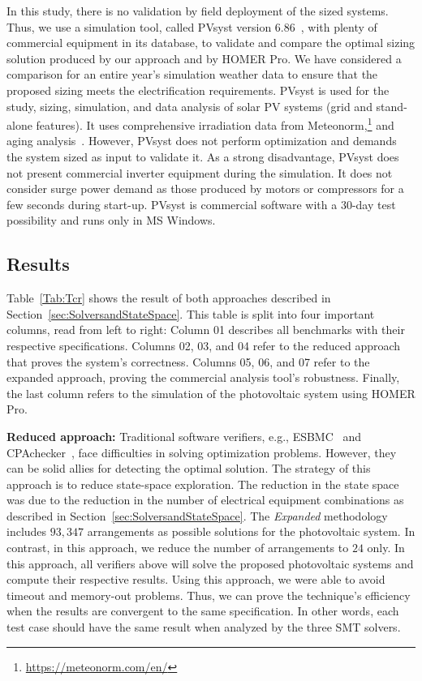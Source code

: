 \documentclass[a4paper,donotrepeattitle,fleqn]{cas-dc}
\begin{document}
In this study, there is no validation by field deployment of the sized systems. Thus, we use a simulation tool, called PVsyst version $6.86$~\cite{PVsyst}, with plenty of commercial equipment in its database, to validate and compare the optimal sizing solution produced by our approach and by HOMER Pro. We have considered a comparison for an entire year's simulation weather data to ensure that the proposed sizing meets the electrification requirements. PVsyst is used for the study, sizing, simulation, and data analysis of solar PV systems (grid and stand-alone features). It uses comprehensive irradiation data from Meteonorm,\footnote{\href{https://meteonorm.com/en/}{https://meteonorm.com/en/}} and aging analysis~\cite{PVsyst2017}. However, PVsyst does not perform optimization and demands the system sized as input to validate it. As a strong disadvantage, PVsyst does not present commercial inverter equipment during the simulation. It does not consider surge power demand as those produced by motors or compressors for a few seconds during start-up. PVsyst is commercial software with a $30$-day test possibility and runs only in MS Windows.


\subsection{Results}
\label{sec:results}

Table~\ref{Tab:Tcr} shows the result of both approaches described in Section~\ref{sec:SolversandStateSpace}. This table is split into four important columns, read from left to right: Column 01 describes all benchmarks with their respective specifications. Columns 02, 03, and 04 refer to the reduced approach that proves the system's correctness. Columns 05, 06, and 07 refer to the expanded approach, proving the commercial analysis tool's robustness. Finally, the last column refers to the simulation of the photovoltaic system using HOMER Pro.

\textbf{Reduced approach:} Traditional software verifiers, e.g., ESBMC~\cite{esbmc2018} and CPAchecker~\cite{Beyer2011}, face difficulties in solving optimization problems. However, they can be solid allies for detecting the optimal solution. The strategy of this approach is to reduce state-space exploration. The reduction in the state space was due to the reduction in the number of electrical equipment combinations as described in Section~\ref{sec:SolversandStateSpace}. The \textit{Expanded} methodology includes $93,347$ arrangements as possible solutions for the photovoltaic system.
In contrast, in this approach, we reduce the number of arrangements to $24$ only. In this approach, all verifiers above will solve the proposed photovoltaic systems and compute their respective results. Using this approach, we were able to avoid timeout and memory-out problems. Thus, we can prove the technique's efficiency when the results are convergent to the same specification. In other words, each test case should have the same result when analyzed by the three SMT solvers.
\end{document}
